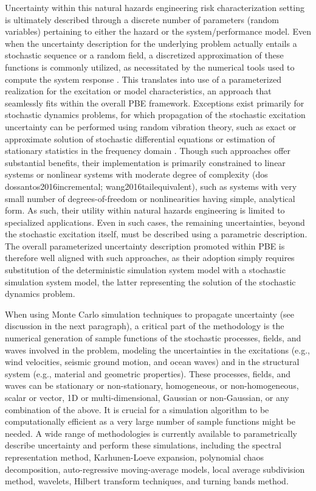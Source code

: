 Uncertainty within this natural hazards engineering risk characterization setting is ultimately described through a discrete number of parameters (random variables) pertaining to either the hazard or the system/performance model. Even when the uncertainty description for the underlying problem actually entails a stochastic sequence or a random field, a discretized approximation of these functions is commonly utilized, as necessitated by the numerical tools used to compute the system response \citep{gidaris2014surrogate}. This translates into use of a parameterized realization for the excitation or model characteristics, an approach that seamlessly fits within the overall PBE framework. Exceptions exist primarily for stochastic dynamics problems, for which propagation of the stochastic excitation uncertainty can be performed using random vibration theory, such as exact or approximate solution of stochastic differential equations or estimation of stationary statistics in the frequency domain \citep{li2009stochastic}. Though such approaches offer substantial benefits, their implementation is primarily constrained to linear systems or nonlinear systems with moderate degree of complexity (dos dossantos2016incremental; wang2016tailequivalent), such as systems with very small number of degrees-of-freedom or nonlinearities having simple, analytical form. As such, their utility within natural hazards engineering is limited to specialized applications. Even in such cases, the remaining uncertainties, beyond the stochastic excitation itself, must be described using a parametric description. The overall parameterized uncertainty description promoted within PBE is therefore well aligned with such approaches, as their adoption simply requires substitution of the deterministic simulation system model with a stochastic simulation system model, the latter representing the solution of the stochastic dynamics problem.

When using Monte Carlo simulation techniques to propagate uncertainty (see discussion in the next paragraph), a critical part of the methodology is the numerical generation of sample functions of the stochastic processes, fields, and waves involved in the problem, modeling the uncertainties in the excitations (e.g., wind velocities, seismic ground motion, and ocean waves) and in the structural system (e.g., material and geometric properties). These processes, fields, and waves can be stationary or non-stationary, homogeneous, or non-homogeneous, scalar or vector, 1D or multi-dimensional, Gaussian or non-Gaussian, or any combination of the above. It is crucial for a simulation algorithm to be computationally efficient as a very large number of sample functions might be needed. A wide range of methodologies is currently available to parametrically describe uncertainty and perform these simulations, including the spectral representation method, Karhunen-Loeve expansion, polynomial chaos decomposition, auto-regressive moving-average models, local average subdivision method, wavelets, Hilbert transform techniques, and turning bands method.

